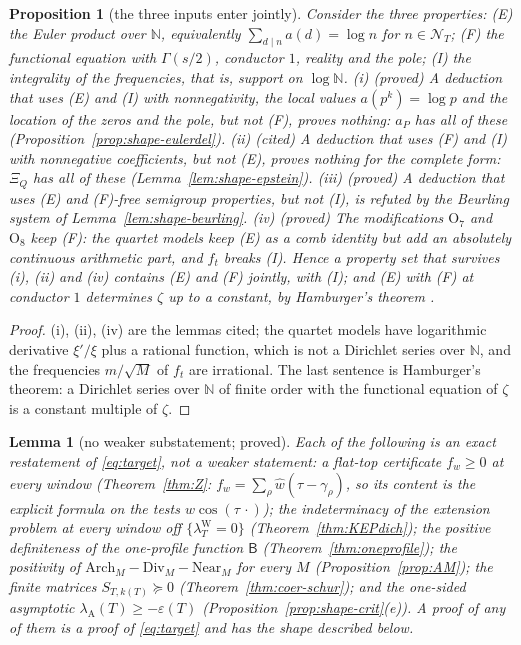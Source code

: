 \documentclass[11pt]{amsart}
\newtheorem{proposition}[theorem]{Proposition}
\newtheorem{lemma}[theorem]{Lemma}
\theoremstyle{definition}
\theoremstyle{remark}
\newcommand{\N}{\mathbb N}
\newcommand{\lamW}{\lambda^{\mathrm W}_T}
\newcommand{\lamA}{\lambda_{\mathrm A}(T)}
\newcommand{\wh}{\widehat w}
\newcommand{\NT}{\mathcal N_T}
\begin{document}
\begin{proposition}[the three inputs enter jointly]\label{prop:shape-inputs}
Consider the three properties: (E) the Euler product over $\N$, equivalently $\sum_{d\mid n}a(d)=\log n$ for $n\in\NT$; (F) the functional
equation with $\Gamma(s/2)$, conductor $1$, reality and the pole; (I) the integrality of the frequencies, that is, support on $\log\N$.
\emph{(i) (proved)} A deduction that uses (E) and (I) with nonnegativity, the local values $a(p^k)=\log p$ and the location of the zeros
and the pole, but not (F), proves nothing: $a_P$ has all of these (Proposition~\ref{prop:shape-eulerdel}).
\emph{(ii) (cited)} A deduction that uses (F) and (I) with nonnegative coefficients, but not (E), proves nothing for the complete form:
$\Xi_Q$ has all of these (Lemma~\ref{lem:shape-epstein}).
\emph{(iii) (proved)} A deduction that uses (E) and (F)-free semigroup properties, but not (I), is refuted by the Beurling system
of Lemma~\ref{lem:shape-beurling}.
\emph{(iv) (proved)} The modifications $\mathrm O_7$ and $\mathrm O_8$ keep (F): the quartet models keep (E) as a comb identity but add an
absolutely continuous arithmetic part, and $f_t$ breaks (I). Hence a property set that survives (i), (ii) and (iv) contains (E) and (F)
jointly, with (I); and (E) with (F) at conductor $1$ determines $\zeta$ up to a constant, by Hamburger's theorem \cite[\S2.13]{Titchmarsh1986}.
\end{proposition}
\begin{proof}
(i), (ii), (iv) are the lemmas cited; the quartet models have logarithmic derivative $\xi'/\xi$ plus a rational function, which is not a
Dirichlet series over $\N$, and the frequencies $m/\sqrt M$ of $f_t$ are irrational. The last sentence is Hamburger's theorem: a Dirichlet
series over $\N$ of finite order with the functional equation of $\zeta$ is a constant multiple of $\zeta$.
\end{proof}

\begin{lemma}[no weaker substatement; proved]\label{lem:shape-restate}
Each of the following is an exact restatement of \eqref{eq:target}, not a weaker statement: a flat-top certificate $f_w\ge0$ at every
window (Theorem~\ref{thm:Z}: $f_w=\sum_\rho\wh(\tau-\gamma_\rho)$, so its content is the explicit formula on the tests $w\cos(\tau\,\cdot)$);
the indeterminacy of the extension problem at every window off $\{\lamW=0\}$ (Theorem~\ref{thm:KEPdich}); the positive definiteness of
the one-profile function $\mathsf B$ (Theorem~\ref{thm:oneprofile}); the positivity of $\mathrm{Arch}_M-\mathrm{Div}_M-\mathrm{Near}_M$ for
every $M$ (Proposition~\ref{prop:AM}); the finite matrices $S_{T,k(T)}\succeq0$ (Theorem~\ref{thm:coer-schur}); and the one-sided
asymptotic $\lamA\ge-\varepsilon(T)$ (Proposition~\ref{prop:shape-crit}(e)). A proof of any of them is a proof of \eqref{eq:target} and has
the shape described below.
\end{lemma}
\end{document}
